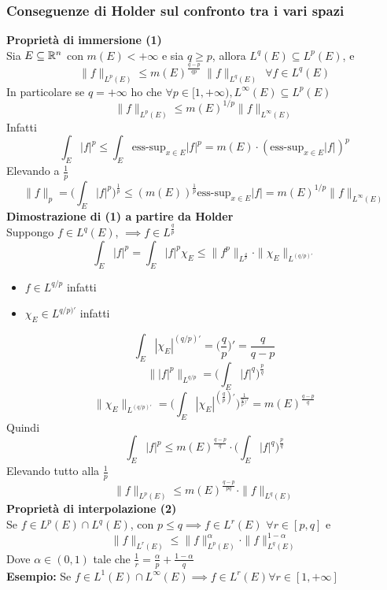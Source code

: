 \subsubsection{Conseguenze di Holder sul confronto tra i vari spazi}
\textbf{Proprietà di immersione (1)}\\ 
Sia $E\subseteq \mathbb{R}^n$ con $m(E)<+\infty$ e sia $q\ge p$, allora $L^q(E)\subseteq L^p(E)$, e 
\[\|f\|_{L^p(E)}\le m(E)^{\frac{q-p}{qp}}\ \|f\|_{L^q(E)}\ \ \forall f\in L^q(E)\]
In particolare se $q=+\infty$ ho che $\forall p\in[1,+\infty),L^\infty(E)\subseteq L^p(E)$
\[\|f\|_{L^p(E)}\le m(E)^{1 / p}\|f\|_{L^\infty(E)}\]
Infatti
\[\int_{E}^{} |f|^p\le \int_{E}^{} \text{ess-sup}_{x\in E}|f|^p=m(E)\cdot (\text{ess-sup}_{x\in E}|f|)^p\]
Elevando a $\frac{1}{p}$
\[\|f\|_p=\bigg(\int_{E}{|f|^p\bigg)^{\frac{1}{p}}}\le (m(E))^{\frac{1}{p}}\text{ess-sup}_{x\in E}|f|=m(E)^{1 / p}\|f\|_{L^\infty(E)}  \]
\textbf{Dimostrazione di (1) a partire da Holder}\\
Suppongo $f\in L^q(E)$, $\implies f\in L^{\frac{q}{p}}$
\[\int_{E}^{} |f|^p=\int_{E}^{} |f|^p\chi_E \le \|f^p\|_{L^{\frac{q}{p}}}\cdot \|\chi_E\|_{L^{(q / p)'}}\]
\begin{itemize}
	\item $f\in L^{q / p}$ infatti 
	\item $\chi_E\in L^{q / p )'}$ infatti
\end{itemize}
\[\int_{E}^{} |\chi_E|^{(q / p)'}=\bigg(\frac{q}{p}\bigg)'=\frac{q}{q-p}\]
\[\ \| |f|^p\|_{L^{q / p}}=\bigg(\int_{E}^{} |f|^q\bigg)^{\frac{p}{q}}\]
\[\|\chi_E\|_{L^{(q / p)'}}=\bigg( \int_{E}^{} |\chi_E|^{(\frac{q}{p})'}\bigg)^{\frac{1}{\frac{q}{p})'}}=m(E)^{\frac{q-p}{q}}\]
Quindi
\[\int_{E}^{} |f|^p\le m(E)^{\frac{q-p}{q}}\cdot \bigg(\int_{E}^{} |f|^q\bigg)^{\frac{p}{q}}\]
Elevando tutto alla $\frac{1}{p}$ 
\[\|f\|_{L^p(E)}\le m(E)^{\frac{q-p}{pq}}\cdot \|f\|_{L^{q}(E)}\]
\textbf{Proprietà di interpolazione (2)}\\
Se $f\in L^p(E)\cap L^q(E)$, con $p\le q\implies f\in L^r(E)$ $\forall  r\in [p,q]$ e
\[\|f\|_{L^r(E)}\le \|f\|_{L^p(E)}^\alpha\cdot \|f\|_{L^{q}(E)}^{1-\alpha}\]
Dove $\alpha\in (0,1)$ tale che $\frac{1}{r}=\frac{\alpha}{p}+\frac{1-\alpha}{q}$\\ 
\textbf{Esempio:} Se $f\in L^{1}(E)\cap L^{\infty}(E)\implies f\in L^{r}(E)\forall r\in [1,+\infty]$
